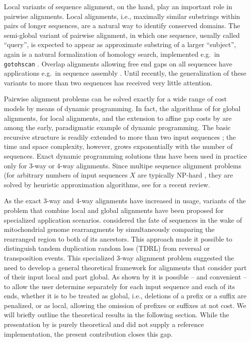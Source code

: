 \documentclass[a4paper,10pt]{article}
\begin{document}
Local variants of sequence alignment, on the hand, play an important role
in pairwise alignments. Local alignments, i.e., maximally similar
substrings within pairs of longer sequences, are a natural way to identify
conserved domains.  The semi-global variant of pairwise alignment, in which
one sequence, usually called ``query'', is expected to appear as
approximate substring of a larger ``subject'', again is a natural
formalization of homology search, implemented e.g.\ in \texttt{gotohscan}
\citep{Hertel:09a}.  Overlap alignments
\citep{Jones:04} allowing free end gaps on all sequences have applications
e.g.\ in sequence assembly \citep{Rausch:09}. Until recently, the
generalization of these variants to more than two sequences has received
very little attention.

Pairwise alignment problems can be solved exactly for a wide range of cost
models by means of dynamic programming. In fact, the algorithms of
\citet{Needleman:70} for global alignments, \citet{Smith:81} for local
alignments, and the extension to affine gap costs by \citet{Gotoh:82} are
among the early, paradigmatic example of dynamic programming. The basic
recursive structure is readily extended to more than two input sequences
\citep{Carillo:88,Lipman:89}; the time and space complexity, however, grows
exponentially with the number of sequences. Exact dynamic programming
solutions thus have been used in practice only for 3-way
\citep{Gotoh:86,Dewey:01,Konagurthu:04,Kruspe:07a} or 4-way
\citep{Steiner:11a} alignments. Since multipe sequence alignment problems
(for arbitrary numbers of input sequences $X$ are typically NP-hard
\citep{Kececioglu:93,Wang:94,Bonizzoni:01,Just:01,Manthey:03,Elias:06},
they are solved by heuristic approximation algorithms, see
\citet{Baichoo:17} for a recent review.

As the exact 3-way and 4-way alignments have increased in usage, variants
of the problem that combine local and global alignments have been proposed
for specialized application scenarios. \citet{AlArab:17a} considered the
fate of sequences in the wake of mitochondrial genome rearrangments by
simultaneously comparing the rearranged region to both of its
ancestors. This approach made it possible to distinguish tandem duplication
random loss (TDRL) from reversal or transposition events. This specialized
3-way alignment problem suggested the need to develop a general theoretical
framework for alignments that consider part of their input local and part
global. As shown by \citet{Retzlaff:18a} it is possible -- and convenient
-- to allow the user determine separately for each input sequence and each
of its ends, whether it is to be treated as global, i.e., deletions of a
prefix or a suffix are penalized, or as local, allowing the omission of
prefixes or suffixes at not cost. We will briefly outline the theoretical
results in the following section. While the presentation by
\citet{Retzlaff:18a} is purely theoretical and did not supply a reference
implementation, the present contribution closes this gap.
\end{document}
